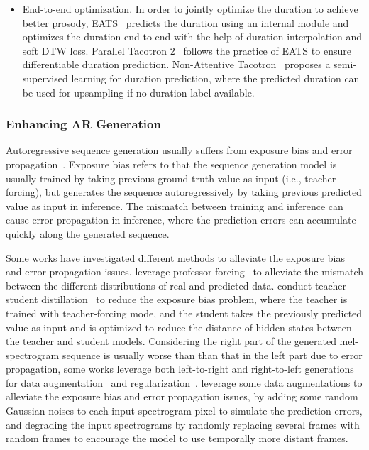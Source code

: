 \documentclass{article}
\begin{document}
\begin{itemize}[leftmargin=*]
    \item End-to-end optimization. In order to jointly optimize the duration to achieve better prosody, EATS~\cite{donahue2020end} predicts the duration using an internal module and optimizes the duration end-to-end with the help of duration interpolation and soft DTW loss. Parallel Tacotron 2~\cite{elias2021parallel} follows the practice of EATS to ensure differentiable duration prediction. Non-Attentive Tacotron~\cite{shen2020non} proposes a semi-supervised learning for duration prediction, where the predicted duration can be used for upsampling if no duration label available.
\end{itemize}



\subsubsection{Enhancing AR Generation}
Autoregressive sequence generation usually suffers from exposure bias and error propagation~\cite{bengio2015scheduled,wu2018beyond}. Exposure bias refers to that the sequence generation model is usually trained by taking previous ground-truth value as input (i.e., teacher-forcing), but generates the sequence autoregressively by taking previous predicted value as input in inference. The mismatch between training and inference can cause error propagation in inference, where the prediction errors can accumulate quickly along the generated sequence.

Some works have investigated different methods to alleviate the exposure bias and error propagation issues. \citet{guo2019new} leverage professor forcing~\cite{goyal2016professor} to alleviate the mismatch between the different distributions of real and predicted data. \citet{liu2020teacher} conduct teacher-student distillation~\cite{hinton2015distilling,kim2016sequence,tan2018multilingual} to reduce the exposure bias problem, where the teacher is trained with teacher-forcing mode, and the student takes the previously predicted value as input and is optimized to reduce the distance of hidden states between the teacher and student models. Considering the right part of the generated mel-spectrogram sequence is usually worse than than that in the left part due to error propagation, some works leverage both left-to-right and right-to-left generations~\cite{tan2019efficient} for data augmentation~\cite{ren2019almost} and regularization~\cite{zheng2019forward}. \citet{vainer2020speedyspeech} leverage some data augmentations to alleviate the exposure bias and error propagation issues, by adding some random Gaussian noises to each input spectrogram pixel to simulate the prediction errors, and degrading the input spectrograms by randomly replacing several frames with random frames to encourage the model to use temporally more distant frames.
\end{document}
